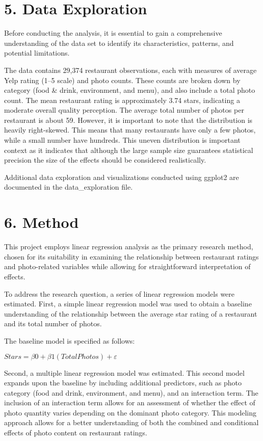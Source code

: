 \documentclass[
]{article}
\begin{document}
\section{5. Data Exploration}\label{data-exploration}

Before conducting the analysis, it is essential to gain a comprehensive
understanding of the data set to identify its characteristics, patterns,
and potential limitations.

The data contains 29,374 restaurant observations, each with measures of
average Yelp rating (1--5 scale) and photo counts. These counts are
broken down by category (food \& drink, environment, and menu), and also
include a total photo count. The mean restaurant rating is approximately
3.74 stars, indicating a moderate overall quality perception. The
average total number of photos per restaurant is about 59. However, it
is important to note that the distribution is heavily right-skewed. This
means that many restaurants have only a few photos, while a small number
have hundreds. This uneven distribution is important context as it
indicates that although the large sample size guarantees statistical
precision the size of the effects should be considered realistically.

Additional data exploration and visualizations conducted using ggplot2
are documented in the data\_exploration file.

\section{6. Method}\label{method}

This project employs linear regression analysis as the primary research
method, chosen for its suitability in examining the relationship between
restaurant ratings and photo-related variables while allowing for
straightforward interpretation of effects.

To address the research question, a series of linear regression models
were estimated. First, a simple linear regression model was used to
obtain a baseline understanding of the relationship between the average
star rating of a restaurant and its total number of photos.

The baseline model is specified as follows:

\(Stars=β0​+β1​(Total Photos)+ε\)

Second, a multiple linear regression model was estimated. This second
model expands upon the baseline by including additional predictors, such
as photo category (food and drink, environment, and menu), and an
interaction term. The inclusion of an interaction term allows for an
assessment of whether the effect of photo quantity varies depending on
the dominant photo category. This modeling approach allows for a better
understanding of both the combined and conditional effects of photo
content on restaurant ratings.
\end{document}
